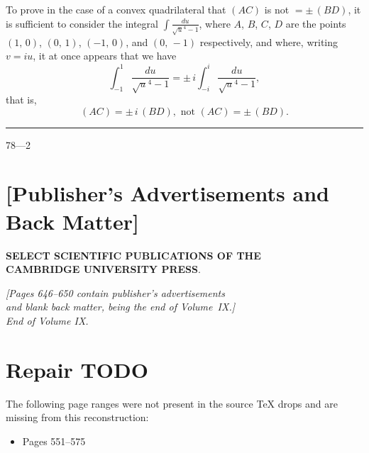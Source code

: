 \documentclass[11pt,a4paper]{book}
\begin{document}
To prove in the case of a convex quadrilateral that $(AC)$ is not $= \pm\,(BD)$, it is sufficient to consider the integral $\displaystyle\int\!\frac{du}{\surd u^4-1}$, where $A$, $B$, $C$, $D$ are the points $(1,\,0)$, $(0,\,1)$, $(-1,\,0)$, and $(0,\,-1)$ respectively, and where, writing $v = iu$, it at once appears that we have
\[
\int_{-1}^{1}\frac{du}{\surd u^4-1} = \pm\,i\int_{-i}^{i}\frac{du}{\surd u^4-1},
\]
that is,
\[
(AC) = \pm\,i\,(BD), \text{ not } (AC) = \pm\,(BD).
\]

\vspace{1ex}
\noindent\rule{2em}{0.4pt}\hfill 78---2
\newpage

\section*{[Publisher's Advertisements and Back Matter]}

\begin{center}
\textbf{SELECT SCIENTIFIC PUBLICATIONS OF THE}\\[4pt]
\textbf{CAMBRIDGE UNIVERSITY PRESS}.
\end{center}

\medskip
\begin{center}
\textit{[Pages 646--650 contain publisher's advertisements}\\
\textit{and blank back matter, being the end of Volume~IX.]}\\[8pt]
\textit{End of Volume IX.}
\end{center}
\clearpage


\clearpage
\section*{Repair TODO}
The following page ranges were not present in the source TeX drops and are missing from this reconstruction:
\begin{itemize}
\item Pages 551--575
\end{itemize}
\end{document}
